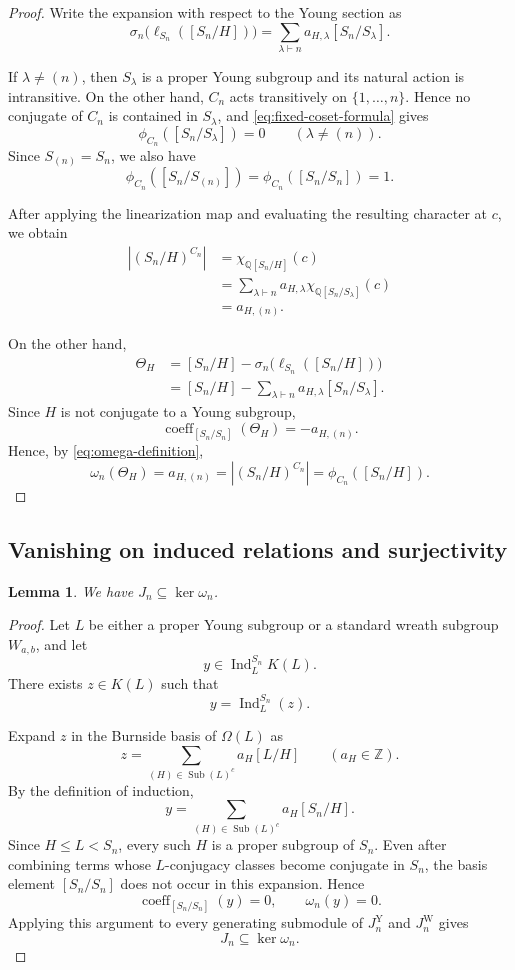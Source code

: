 \documentclass[a4paper,11pt]{article}
\numberwithin{equation}{section}
\newtheorem{lemma}[theorem]{Lemma}
\newcommand{\Q}{\mathbb{Q}}
\newcommand{\Z}{\mathbb{Z}}
\newcommand{\Ind}{\operatorname{Ind}}
\newcommand{\coeff}{\operatorname{coeff}}
\begin{document}
\begin{proof}
Write the expansion with respect to the Young section as
\[
  \sigma_n\bigl(\ell_{S_n}([S_n/H])\bigr)
  =
  \sum_{\lambda\vdash n}
  a_{H,\lambda}[S_n/S_\lambda].
\]

If $\lambda\ne(n)$, then $S_\lambda$ is a proper Young subgroup and its
natural action is intransitive. On the other hand, $C_n$ acts transitively on
$\{1,\ldots,n\}$. Hence no conjugate of $C_n$ is contained in $S_\lambda$, and
\eqref{eq:fixed-coset-formula} gives
\[
  \phi_{C_n}([S_n/S_\lambda])=0
  \qquad
  (\lambda\ne(n)).
\]
Since $S_{(n)}=S_n$, we also have
\[
  \phi_{C_n}([S_n/S_{(n)}])
  =
  \phi_{C_n}([S_n/S_n])
  =
  1.
\]

After applying the linearization map and evaluating the resulting character at
$c$, we obtain
\[
\begin{aligned}
  |(S_n/H)^{C_n}|
  &=
  \chi_{\Q[S_n/H]}(c)\\
  &=
  \sum_{\lambda\vdash n}
  a_{H,\lambda}
  \chi_{\Q[S_n/S_\lambda]}(c)\\
  &=
  a_{H,(n)}.
\end{aligned}
\]

On the other hand,
\[
\begin{aligned}
  \Theta_H
  &=
  [S_n/H]
  -
  \sigma_n\bigl(\ell_{S_n}([S_n/H])\bigr)\\
  &=
  [S_n/H]
  -
  \sum_{\lambda\vdash n}
  a_{H,\lambda}[S_n/S_\lambda].
\end{aligned}
\]
Since $H$ is not conjugate to a Young subgroup,
\[
  \coeff_{[S_n/S_n]}(\Theta_H)=-a_{H,(n)}.
\]
Hence, by \eqref{eq:omega-definition},
\[
  \omega_n(\Theta_H)
  =
  a_{H,(n)}
  =
  |(S_n/H)^{C_n}|
  =
  \phi_{C_n}([S_n/H]).
\]
\end{proof}

\subsection{Vanishing on induced relations and surjectivity}

\begin{lemma}\label{lem:omega-J}
We have $J_n\subseteq\ker\omega_n$.
\end{lemma}

\begin{proof}
Let $L$ be either a proper Young subgroup or a standard wreath subgroup
$W_{a,b}$, and let
\[
  y\in\Ind_L^{S_n}K(L).
\]
There exists $z\in K(L)$ such that
\[
  y=\Ind_L^{S_n}(z).
\]

Expand $z$ in the Burnside basis of $\Omega(L)$ as
\[
  z
  =
  \sum_{(H)\in\operatorname{Sub}(L)^c}
  a_H[L/H]
  \qquad
  (a_H\in\Z).
\]
By the definition of induction,
\[
  y
  =
  \sum_{(H)\in\operatorname{Sub}(L)^c}
  a_H[S_n/H].
\]
Since $H\le L<S_n$, every such $H$ is a proper subgroup of $S_n$. Even after
combining terms whose $L$-conjugacy classes become conjugate in $S_n$, the
basis element $[S_n/S_n]$ does not occur in this expansion. Hence
\[
  \coeff_{[S_n/S_n]}(y)=0,
  \qquad
  \omega_n(y)=0.
\]
Applying this argument to every generating submodule of $J_n^{\mathrm Y}$ and
$J_n^{\mathrm W}$ gives
\[
  J_n\subseteq\ker\omega_n.
\]
\end{proof}
\end{document}
